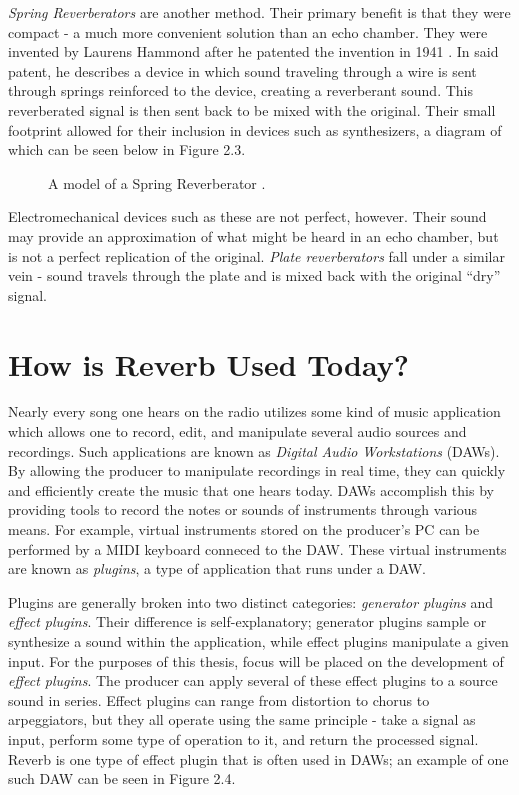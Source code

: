 \textit{Spring Reverberators} are another method. Their primary benefit is that they were compact - a much more convenient solution than an echo chamber. They were invented by Laurens Hammond after he patented the invention in 1941 \cite{laurens1941electrical}. In said patent, he describes a device in which sound traveling through a wire is sent through springs reinforced to the device, creating a reverberant sound. This reverberated signal is then sent back to be mixed with the original. Their small footprint allowed for their inclusion in devices such as synthesizers, a diagram of which can be seen below in Figure 2.3.

\begin{figure}[h] %
	\begin{center}
		\caption{A model of a Spring Reverberator \cite{devoe1977electronmusic}.}
	\end{center}
\end{figure}

Electromechanical devices such as these are not perfect, however. Their sound may provide an approximation of what might be heard in an echo chamber, but is not a perfect replication of the original. \textit{Plate reverberators} fall under a similar vein - sound travels through the plate and is mixed back with the original ``dry'' signal.

\section{How is Reverb Used Today?}
Nearly every song one hears on the radio utilizes some kind of music application which allows one to record, edit, and manipulate several audio sources and recordings. Such applications are known as \textit{Digital Audio Workstations} (DAWs). By allowing the producer to manipulate recordings in real time, they can quickly and efficiently create the music that one hears today. DAWs accomplish this by providing tools to record the notes or sounds of instruments through various means. For example, virtual instruments stored on the producer's PC can be performed by a MIDI keyboard conneced to the DAW. These virtual instruments are known as \textit{plugins}, a type of application that runs under a DAW.

Plugins are generally broken into two distinct categories: \textit{generator plugins} and \textit{effect plugins}. Their difference is self-explanatory; generator plugins sample or synthesize a sound within the application, while effect plugins manipulate a given input. For the purposes of this thesis, focus will be placed on the development of \textit{effect plugins}. The producer can apply several of these effect plugins to a source sound in series. Effect plugins can range from distortion to chorus to arpeggiators, but they all operate using the same principle - take a signal as input, perform some type of operation to it, and return the processed signal. Reverb is one type of effect plugin that is often used in DAWs; an example of one such DAW can be seen in Figure 2.4.

